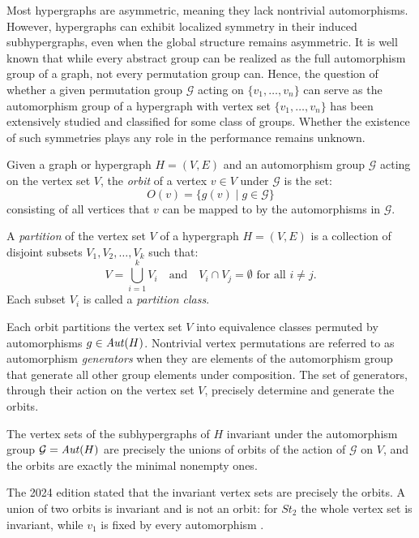 Most hypergraphs are asymmetric, meaning they lack nontrivial automorphisms. However, hypergraphs can exhibit localized symmetry in their induced subhypergraphs, even when the global structure remains asymmetric. It is well known that while every abstract group can be realized as the full automorphism group of a graph, not every permutation group can. Hence, the question of whether a given permutation group $\mathcal{G}$ acting on $\{v_1,\dots,v_n\}$ can serve as the automorphism group of a hypergraph with vertex set $\{v_1,\dots,v_n\}$ has been extensively studied and classified for some class of groups. Whether the existence of such symmetries plays any role in the \FKA{} performance remains unknown.

\begin{definition}
Given a graph or hypergraph $H=(V,E)$ and an automorphism group $\mathcal{G}$ acting on the vertex set $V$, the \emph{orbit} of a vertex $v\in V$ under $\mathcal{G}$ is the set:
\[
O(v)=\{g(v)\mid g\in\mathcal{G}\}
\]
consisting of all vertices that $v$ can be mapped to by the automorphisms in $\mathcal{G}$.
\end{definition}

\begin{definition}
A \emph{partition} of the vertex set $V$ of a hypergraph $H=(V,E)$ is a collection of disjoint subsets $V_1,V_2,\dots,V_k$ such that:
\[
V=\bigcup_{i=1}^{k}V_i\quad\text{and}\quad V_i\cap V_j=\emptyset\text{ for all }i\neq j.
\]
Each subset $V_i$ is called a \emph{partition class}.
\end{definition}

Each orbit partitions the vertex set $V$ into equivalence classes permuted by automorphisms $g\in\mathit{Aut}(H)$. Nontrivial vertex permutations are referred to as automorphism \emph{generators} when they are elements of the automorphism group that generate all other group elements under composition. The set of generators, through their action on the vertex set $V$, precisely determine and generate the orbits.

\begin{claim}
The vertex sets of the subhypergraphs of $H$ invariant under the automorphism group $\mathcal{G}=\mathit{Aut}(H)$ are precisely the unions of orbits of the action of $\mathcal{G}$ on $V$, and the orbits are exactly the minimal nonempty ones. \cite{Lec}
\end{claim}

The 2024 edition stated that the invariant vertex sets are precisely the orbits. A union of two orbits is invariant and is not an orbit: for $St_2$ the whole vertex set is invariant, while $v_1$ is fixed by every automorphism .

